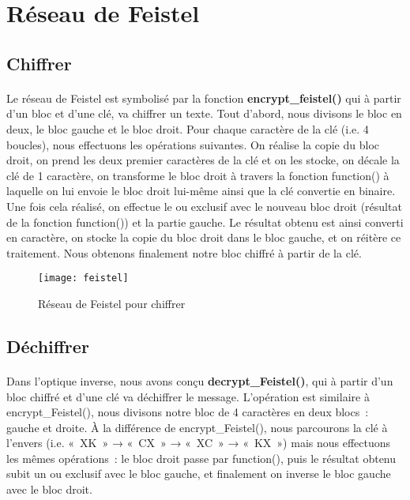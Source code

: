\documentclass[11pt,fleqn]{book} %
\begin{document}
\section{Réseau de Feistel}

\subsection{Chiffrer}

\paragraph{}Le réseau de Feistel est symbolisé par la fonction \textbf{encrypt\_feistel()} qui à partir d'un bloc et d'une clé, va chiffrer un texte. Tout d'abord, nous divisons le bloc en deux, le bloc gauche et le bloc droit. Pour chaque caractère de la clé (i.e. 4 boucles), nous effectuons les opérations suivantes. On réalise la copie du bloc droit, on prend les deux premier caractères de la clé et on les stocke, on décale la clé de 1 caractère, on transforme le bloc droit à travers la fonction function() à laquelle on lui envoie le bloc droit lui-même ainsi que la clé convertie en binaire. Une fois cela réalisé, on effectue le ou exclusif avec le nouveau bloc droit (résultat de la fonction function()) et la partie gauche. Le résultat obtenu est ainsi converti en caractère, on stocke la copie du bloc droit dans le bloc gauche, et on réitère ce traitement. Nous obtenons finalement notre bloc chiffré à partir de la clé.
\clearpage
\begin{figure}[!h]
\centering\texttt{[image: feistel]}
\caption{Réseau de Feistel pour chiffrer}
\end{figure}



\subsection{Déchiffrer}

\paragraph{}Dans l'optique inverse, nous avons conçu \textbf{decrypt\_Feistel()}, qui à partir d'un bloc chiffré et d'une clé va déchiffrer le message. L'opération est similaire à encrypt\_Feistel(), nous divisons notre bloc de 4 caractères en deux blocs : gauche et droite. À la différence de encrypt\_Feistel(), nous parcourons la clé à l'envers (i.e. « XK » → « CX » → « XC » → « KX ») mais nous effectuons les mêmes opérations : le bloc droit passe par function(), puis le résultat obtenu subit un ou exclusif avec le bloc gauche, et finalement on inverse le bloc gauche avec le bloc droit.
\end{document}
